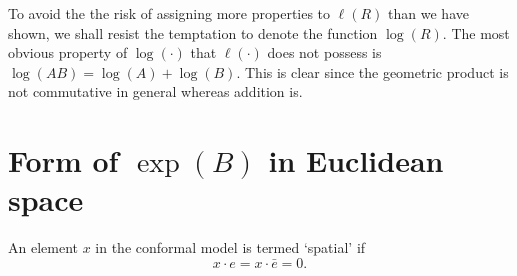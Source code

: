 To avoid the the risk of assigning more properties to $\ell(R)$ than we have
shown, we shall resist the temptation to denote the function $\log(R)$. The
most obvious property of $\log(\cdot)$ that $\ell(\cdot)$ does not possess is
$\log(AB) = \log(A) + \log(B)$. This is clear since the geometric product is
not commutative in general whereas addition is.

\section{Form of $\exp(B)$ in Euclidean space}
\label{subsec:form}

\begin{definition}
An element $x$ in the conformal model is termed `spatial' if
\[
x \cdot e = x \cdot \bar{e} = 0.
\]
\end{definition}

